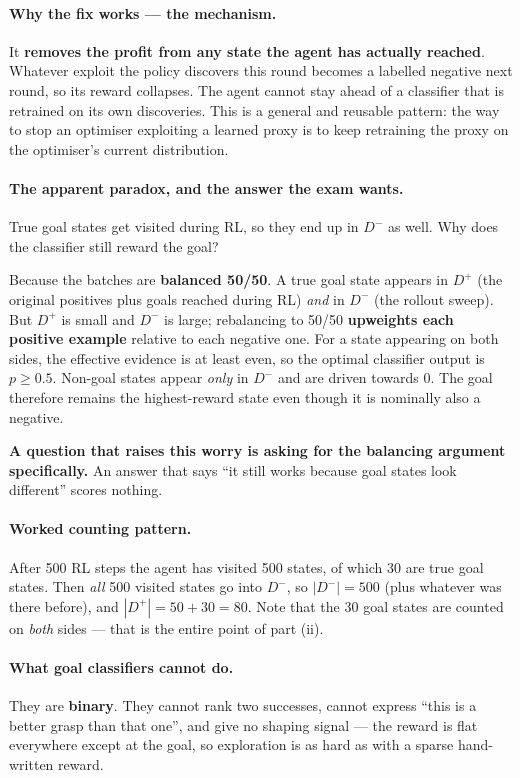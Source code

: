 \documentclass[11pt,a4paper]{article}
\begin{document}
\paragraph{Why the fix works --- the mechanism.} It \textbf{removes the profit
from any state the agent has actually reached}. Whatever exploit the policy
discovers this round becomes a labelled negative next round, so its reward
collapses. The agent cannot stay ahead of a classifier that is retrained on
its own discoveries. This is a general and reusable pattern: the way to stop
an optimiser exploiting a learned proxy is to keep retraining the proxy on the
optimiser's current distribution.

\paragraph{The apparent paradox, and the answer the exam wants.} True goal
states get visited during RL, so they end up in $D^-$ as well. Why does the
classifier still reward the goal?

Because the batches are \textbf{balanced 50/50}. A true goal state appears
in $D^+$ (the original positives plus goals reached during RL) \emph{and} in
$D^-$ (the rollout sweep). But $D^+$ is small and $D^-$ is large; rebalancing
to 50/50 \textbf{upweights each positive example} relative to each negative
one. For a state appearing on both sides, the effective evidence is at least
even, so the optimal classifier output is $p\ge 0.5$. Non-goal states appear
\emph{only} in $D^-$ and are driven towards $0$. The goal therefore remains
the highest-reward state even though it is nominally also a negative.

\medskip
\noindent\textbf{A question that raises this worry is asking for the balancing
argument specifically.} An answer that says ``it still works because goal
states look different'' scores nothing.

\paragraph{Worked counting pattern.} After 500 RL steps the agent has visited
500 states, of which 30 are true goal states. Then \emph{all} 500 visited
states go into $D^-$, so $|D^-| = 500$ (plus whatever was there before), and
$|D^+| = 50 + 30 = 80$. Note that the 30 goal states are counted on
\emph{both} sides --- that is the entire point of part (ii).

\paragraph{What goal classifiers cannot do.} They are \textbf{binary}. They
cannot rank two successes, cannot express ``this is a better grasp than that
one'', and give no shaping signal --- the reward is flat everywhere except at
the goal, so exploration is as hard as with a sparse hand-written reward.
\end{document}
